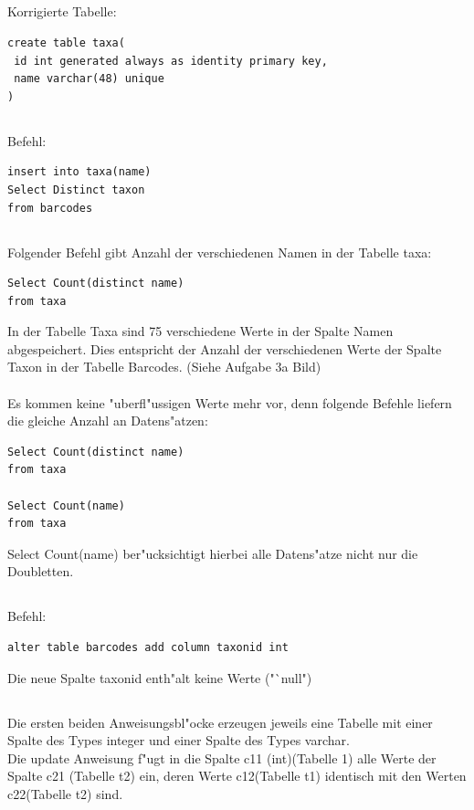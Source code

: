 \documentclass[a4paper, 11pt, titlepage]{article}
\begin{document}
\subsection{}
Korrigierte Tabelle:
\begin{verbatim}
create table taxa(
 id int generated always as identity primary key,
 name varchar(48) unique
)
\end{verbatim}
\subsection{}
Befehl:
\begin{verbatim}
insert into taxa(name)
Select Distinct taxon
from barcodes
\end{verbatim}
\subsection{}
Folgender Befehl gibt Anzahl der verschiedenen Namen in der Tabelle taxa:
\begin{verbatim}
Select Count(distinct name)
from taxa
\end{verbatim}
In der Tabelle Taxa sind 75 verschiedene Werte in der Spalte Namen abgespeichert. Dies entspricht der Anzahl der verschiedenen Werte der Spalte Taxon in der Tabelle Barcodes. (Siehe Aufgabe 3a Bild)\\
\\
Es kommen keine "uberfl"ussigen Werte mehr vor, denn folgende Befehle liefern die gleiche Anzahl an Datens"atzen:
\begin{verbatim}
Select Count(distinct name)
from taxa

Select Count(name)
from taxa
\end{verbatim}
Select Count(name) ber"ucksichtigt hierbei alle Datens"atze nicht nur die Doubletten.
\subsection{}
Befehl:
\begin{verbatim}
alter table barcodes add column taxonid int
\end{verbatim}
Die neue Spalte taxonid enth"alt keine Werte ("`null")\\
\subsection{}
Die ersten beiden Anweisungsbl"ocke erzeugen jeweils eine Tabelle mit einer Spalte des Types integer und einer Spalte des Types varchar.\\
Die update Anweisung f"ugt in die Spalte c11 (int)(Tabelle 1) alle Werte der Spalte c21 (Tabelle t2) ein, deren Werte c12(Tabelle t1) identisch mit den Werten c22(Tabelle t2) sind.
\end{document}
